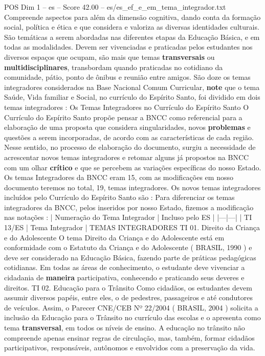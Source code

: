 \begin{textsample}{POS Dim 1 – es – Score 42.00 – es/es\_ef\_e\_em\_tema\_integrador.txt}
Compreende aspectos para além da dimensão cognitiva, dando conta da formação social, política e ética e que considera e valoriza as diversas identidades culturais.
São temáticas a serem abordadas nas diferentes etapas da Educação Básica, e em todas as modalidades.
Devem ser vivenciadas e praticadas pelos estudantes nos diversos espaços que ocupam, são mais que temas \textbf{transversais} ou \textbf{multidisciplinares}, transbordam quando praticadas no cotidiano da comunidade, pátio, ponto de ônibus e reunião entre amigos.
São doze os temas integradores considerados na Base Nacional Comum Curricular, \textbf{note} que o tema Saúde, Vida familiar e Social, no currículo do Espírito Santo, foi dividido em dois temas integradores : Os Temas Integradores no Currículo do Espírito Santo O Currículo do Espírito Santo propõe pensar a BNCC como referencial para a elaboração de uma proposta que considera singularidades, novos \textbf{problemas} e questões a serem incorporadas, de acordo com as características de cada região.
Nesse sentido, no processo de elaboração do documento, surgiu a necessidade de acrescentar novos temas integradores e retomar alguns já propostos na BNCC com um olhar \textbf{crítico} e que se percebem as variações específicas do nosso Estado.
Os temas Integradores da BNCC eram 15, com as modificações em nosso documento teremos no total, 19, temas integradores.
Os novos temas integradores incluídos pelo Currículo do Espírito Santo são : Para diferenciar os temas integradores da BNCC, pelos inseridos por nosso Estado, fizemos a modificação nas notações : | Numeração do Tema Integrador | Incluso pelo ES | |---|---| | TI 13/ES | Tema Integrador | TEMAS INTEGRADORES TI 01.
Direito da Criança e do Adolescente O tema Direito da Criança e do Adolescente está em conformidade com o Estatuto da Criança e do Adolescente ( BRASIL, 1990 ) e deve ser considerado na Educação Básica, fazendo parte de práticas pedagógicas cotidianas.
Em todas as áreas de conhecimento, o estudante deve vivenciar a cidadania de \textbf{maneira} participativa, conhecendo e praticando seus deveres e direitos.
TI 02.
Educação para o Trânsito Como cidadãos, os estudantes devem assumir diversos papéis, entre eles, o de pedestres, passageiros e até condutores de veículos.
Assim, o Parecer CNE/CEB Nº 22/2004 ( BRASIL, 2004 ) solicita a inclusão da Educação para o Trânsito no currículo das escolas e o apresenta como tema \textbf{transversal}, em todos os níveis de ensino.
A educação no trânsito não compreende apenas ensinar regras de circulação, mas, também, formar cidadãos participativos, responsáveis, autônomos e envolvidos com a preservação da vida.

\end{textsample}
